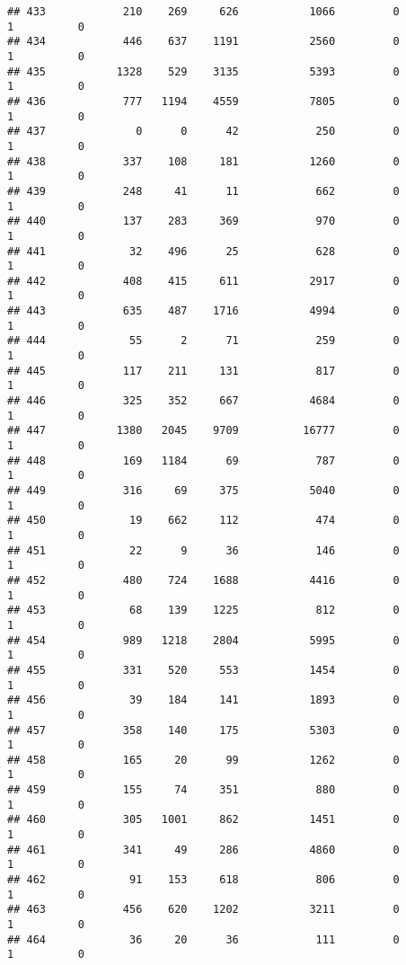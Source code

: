 \documentclass[
]{article}
\begin{document}
\begin{verbatim}
## 433            210    269     626           1066         0         1          0
## 434            446    637    1191           2560         0         1          0
## 435           1328    529    3135           5393         0         1          0
## 436            777   1194    4559           7805         0         1          0
## 437              0      0      42            250         0         1          0
## 438            337    108     181           1260         0         1          0
## 439            248     41      11            662         0         1          0
## 440            137    283     369            970         0         1          0
## 441             32    496      25            628         0         1          0
## 442            408    415     611           2917         0         1          0
## 443            635    487    1716           4994         0         1          0
## 444             55      2      71            259         0         1          0
## 445            117    211     131            817         0         1          0
## 446            325    352     667           4684         0         1          0
## 447           1380   2045    9709          16777         0         1          0
## 448            169   1184      69            787         0         1          0
## 449            316     69     375           5040         0         1          0
## 450             19    662     112            474         0         1          0
## 451             22      9      36            146         0         1          0
## 452            480    724    1688           4416         0         1          0
## 453             68    139    1225            812         0         1          0
## 454            989   1218    2804           5995         0         1          0
## 455            331    520     553           1454         0         1          0
## 456             39    184     141           1893         0         1          0
## 457            358    140     175           5303         0         1          0
## 458            165     20      99           1262         0         1          0
## 459            155     74     351            880         0         1          0
## 460            305   1001     862           1451         0         1          0
## 461            341     49     286           4860         0         1          0
## 462             91    153     618            806         0         1          0
## 463            456    620    1202           3211         0         1          0
## 464             36     20      36            111         0         1          0

\end{verbatim}
\end{document}
